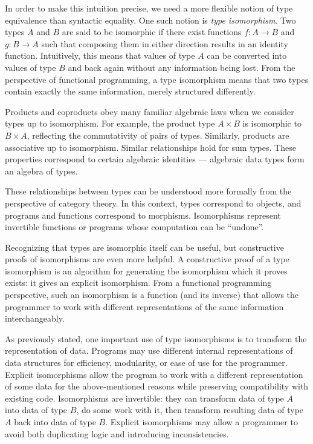 \documentclass{msthesis}
\theoremstyle{definition}
\begin{document}
In order to make this intuition precise, we need a more flexible notion of type equivalence than syntactic equality.  One such notion is \emph{type isomorphism}.  Two types $A$ and $B$ are said to be isomorphic if there exist functions $f : A \to B$ and $g : B \to A$ such that composing them in either direction results in an identity function. Intuitively, this means that values of type $A$ can be converted into values of type $B$ and back again without any information being lost.  From the perspective of functional programming, a type isomorphism means that two types contain exactly the same information, merely structured differently.

Products and coproducts obey many familiar algebraic laws when we consider types up to isomorphism.  For example, the product type $A \times B$ is isomorphic to $B \times A$, reflecting the commutativity of pairs of types.  Similarly, products are associative up to isomorphism.  Similar relationships hold for sum types.  These properties correspond to certain algebraic identities --- algebraic data types form an algebra of types.

These relationships between types can be understood more formally from the perspective of category theory.  In this context, types correspond to objects, and programs and functions correspond to morphisms.  Isomorphisms represent invertible functions or programs whose computation can be ``undone''.

Recognizing that types are isomorphic itself can be useful, but constructive proofs of isomorphisms are even more helpful.  A constructive proof of a type isomorphism is an algorithm for generating the isomorphism which it proves exists: it gives an explicit isomorphism.  From a functional programming perspective, such an isomorphism is a function (and its inverse) that allows the programmer to work with different representations of the same information interchangeably.

As previously stated, one important use of type isomorphisms is to transform the representation of data.  Programs may use different internal representations of data structures for efficiency, modularity, or ease of use for the programmer.  Explicit isomorphisms allow the program to work with a different representation of some data for the above-mentioned reasons while preserving compatibility with existing code.  Isomorphisms are invertible: they can transform data of type $A$ into data of type $B$, do some work with it, then transform resulting data of type $A$ back into data of type $B$.  Explicit isomorphisms may allow a programmer to avoid both duplicating logic and introducing inconsistencies.
\end{document}

